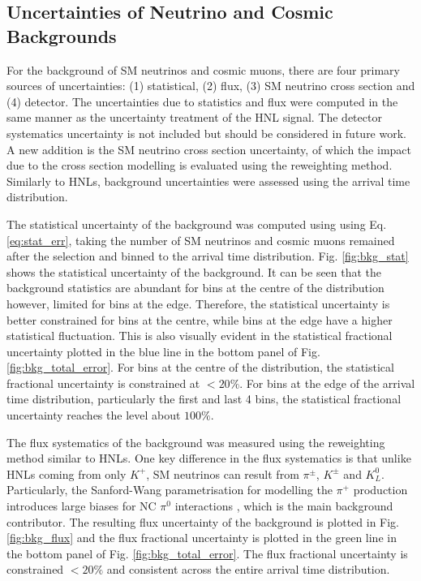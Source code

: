 \subsection{Uncertainties of Neutrino and Cosmic Backgrounds}
\label{sec:bkg_error}

For the background of SM neutrinos and cosmic muons, there are four primary sources of uncertainties: (1) statistical, (2) flux, (3) SM neutrino cross section and (4) detector.
The uncertainties due to statistics and flux were computed in the same manner as the uncertainty treatment of the HNL signal.
The detector systematics uncertainty is not included but should be considered in future work.
A new addition is the SM neutrino cross section uncertainty, of which the impact due to the cross section modelling is evaluated using the reweighting method.
Similarly to HNLs, background uncertainties were assessed using the arrival time distribution.  

The statistical uncertainty of the background was computed using using Eq. \ref{eq:stat_err}, taking the number of SM neutrinos and cosmic muons remained after the selection and binned to the arrival time distribution.
Fig. \ref{fig:bkg_stat} shows the statistical uncertainty of the background.
It can be seen that the background statistics are abundant for bins at the centre of the distribution however, limited for bins at the edge.
Therefore, the statistical uncertainty is better constrained for bins at the centre, while bins at the edge have 
a higher statistical fluctuation.
This is also visually evident in the statistical fractional uncertainty plotted in the blue line in the bottom panel of Fig. \ref{fig:bkg_total_error}.
For bins at the centre of the distribution, the statistical fractional uncertainty is constrained at $< 20\%$.
For bins at the edge of the arrival time distribution, particularly the first and last 4 bins, the statistical fractional uncertainty reaches the level about $100\%$.

The flux systematics of the background was measured using the reweighting method similar to HNLs.
One key difference in the flux systematics is that unlike HNLs coming from only $K^+$, SM neutrinos can result from $\pi^\pm$, $K^\pm$ and $K^0_L$.%
Particularly, the Sanford-Wang parametrisation for modelling the $\pi^+$ production introduces large biases for NC $\pi^0$ interactions \cite{EdPhD}, which is the main background contributor.
The resulting flux uncertainty of the background is plotted in Fig. \ref{fig:bkg_flux} and the flux fractional uncertainty is plotted in the green line in the bottom panel of Fig. \ref{fig:bkg_total_error}.
The flux fractional uncertainty is constrained $<20 \%$ and consistent across the entire arrival time distribution.

